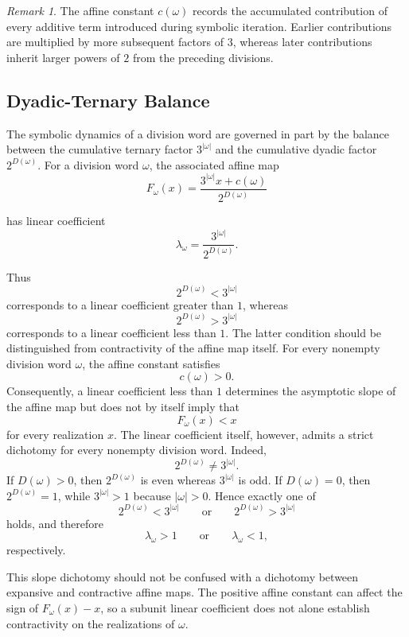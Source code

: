 \documentclass[12pt, oneside]{article}
\numberwithin{equation}{section}
\theoremstyle{definition}
\theoremstyle{plain}
\theoremstyle{remark}
\newtheorem*{remark}{Remark}
\begin{document}
\begin{remark}
The affine constant \(c(\omega)\) records the accumulated contribution
of every additive term introduced during symbolic iteration. Earlier
contributions are multiplied by more subsequent factors of \(3\),
whereas later contributions inherit larger powers of \(2\) from the
preceding divisions.
\end{remark}

\subsection{Dyadic-Ternary Balance}

The symbolic dynamics of a division word are governed in part by the balance
between the cumulative ternary factor \(3^{|\omega|}\) and the cumulative
dyadic factor \(2^{D(\omega)}\). For a division word \(\omega\), the associated
affine map
\[
F_\omega(x)
=
\frac{3^{|\omega|}x+c(\omega)}
     {2^{D(\omega)}}
\]

has linear coefficient
\[
\lambda_\omega
=
\frac{3^{|\omega|}}{2^{D(\omega)}}.
\]

Thus
\[
2^{D(\omega)}<3^{|\omega|}
\]
corresponds to a linear coefficient greater than \(1\), whereas
\[
2^{D(\omega)}>3^{|\omega|}
\]
corresponds to a linear coefficient less than \(1\). The latter
condition should be distinguished from contractivity of the affine
map itself. For every nonempty division word \(\omega\), the affine
constant satisfies
\[
c(\omega)>0.
\]
Consequently, a linear coefficient less than \(1\) determines the
asymptotic slope of the affine map but does not by itself imply that
\[
F_\omega(x)<x
\]
for every realization \(x\). The linear coefficient itself, however,
admits a strict dichotomy for every nonempty division word. Indeed,
\[
2^{D(\omega)}\neq 3^{|\omega|}.
\]
If \(D(\omega)>0\), then \(2^{D(\omega)}\) is even whereas
\(3^{|\omega|}\) is odd. If \(D(\omega)=0\), then
\(2^{D(\omega)}=1\), while \(3^{|\omega|}>1\) because
\(|\omega|>0\). Hence exactly one of
\[
2^{D(\omega)}<3^{|\omega|}
\qquad\text{or}\qquad
2^{D(\omega)}>3^{|\omega|}
\]
holds, and therefore
\[
\lambda_\omega>1
\qquad\text{or}\qquad
\lambda_\omega<1,\]
respectively.

This slope dichotomy should not be confused with a dichotomy between
expansive and contractive affine maps. The positive affine constant can
affect the sign of \(F_\omega(x)-x\), so a subunit linear coefficient does
not alone establish contractivity on the realizations of \(\omega\).
\end{document}
